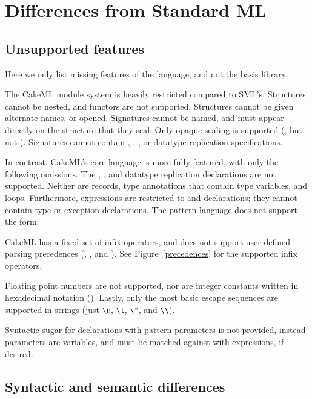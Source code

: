\documentclass[12pt,a4paper]{book}
\begin{document}
\section{Differences from Standard ML}

\subsection{Unsupported features}
Here we only list missing features of the language, and not the basis library.

The CakeML module system is heavily restricted compared to SML's. Structures cannot be nested, and functors are not supported. Structures cannot be given alternate names, or opened. Signatures cannot be named, and must appear directly on the structure that they seal. Only opaque sealing is supported (\smlinline{:>}, but not \smlinline{:}). Signatures cannot contain , , ,  or datatype replication specifications.

In contrast, CakeML's core language is more fully featured, with only the following omissions. The , , and datatype replication declarations are not supported. Neither are records, type annotations that contain type variables, and  loops. Furthermore,  expressions are restricted to  and  declarations; they cannot contain type or exception declarations. The pattern language does not support the  form.

CakeML has a fixed set of infix operators, and does not support user defined parsing precedences (, , and ). See Figure~\ref{precedences} for the supported infix operators.

Floating point numbers are not supported, nor are integer constants written in hexadecimal notation (). Lastly, only the most basic escape sequences are supported in strings (just \texttt{\textbackslash n}, \texttt{\textbackslash t}, \texttt{\textbackslash "}, and \texttt{\textbackslash\textbackslash}).

Syntactic sugar for  declarations with pattern parameters is not provided, instead parameters are variables, and must be matched against with  expressions, if desired.

\subsection{Syntactic and semantic differences}
\end{document}
